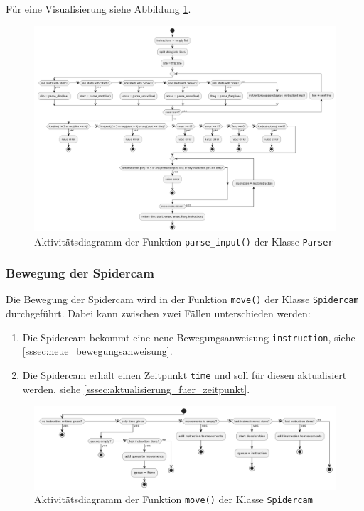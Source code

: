 Für eine Visualisierung siehe Abbildung \ref{fig:parse_input}.

\begin{figure}[H]
    \centering
    \includegraphics[width=\textwidth]{../python/uml/activity_parse_input.png}
    \caption{Aktivitätsdiagramm der Funktion \texttt{parse\_input()} der Klasse \texttt{Parser}}
    \label{fig:parse_input}
\end{figure}

\subsubsection{Bewegung der Spidercam}
\label{sssec:bewegung_der_spidercam}

Die Bewegung der Spidercam wird in der Funktion \texttt{move()} der Klasse \texttt{Spidercam} durchgeführt.
Dabei kann zwischen zwei Fällen unterschieden werden:
\begin{enumerate}
    \item Die Spidercam bekommt eine neue Bewegungsanweisung \texttt{instruction}, siehe \ref{sssec:neue_bewegungsanweisung}.
    \item Die Spidercam erhält einen Zeitpunkt \texttt{time} und soll für diesen aktualisiert werden, siehe \ref{sssec:aktualisierung_fuer_zeitpunkt}.
\end{enumerate}

\begin{figure}[H]
    \centering
    \includegraphics[width=\textwidth]{../python/uml/activity_move.png}
    \caption{Aktivitätsdiagramm der Funktion \texttt{move()} der Klasse \texttt{Spidercam}}
    \label{fig:move}
\end{figure}

